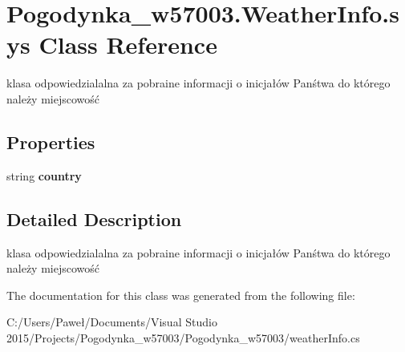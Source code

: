 \hypertarget{class_pogodynka__w57003_1_1_weather_info_1_1sys}{}\section{Pogodynka\+\_\+w57003.\+Weather\+Info.\+sys Class Reference}
\label{class_pogodynka__w57003_1_1_weather_info_1_1sys}


klasa odpowiedzialalna za pobraine informacji o inicjałów Panśtwa do którego należy miejscowość  


\subsection*{Properties}
\begin{DoxyCompactItemize}
\item 
\mbox{\label{class_pogodynka__w57003_1_1_weather_info_1_1sys_a021e9a76576bbccd81e1fd325ac2d7a5}} 
string {\bfseries country}
\end{DoxyCompactItemize}


\subsection{Detailed Description}
klasa odpowiedzialalna za pobraine informacji o inicjałów Panśtwa do którego należy miejscowość 



The documentation for this class was generated from the following file\+:\begin{DoxyCompactItemize}
\item 
C\+:/\+Users/\+Paweł/\+Documents/\+Visual Studio 2015/\+Projects/\+Pogodynka\+\_\+w57003/\+Pogodynka\+\_\+w57003/weather\+Info.\+cs\end{DoxyCompactItemize}
